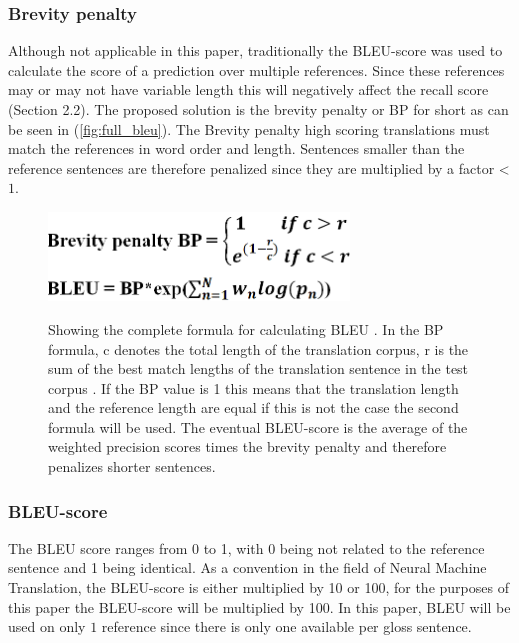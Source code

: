 \subsubsection{Brevity penalty}
Although not applicable in this paper, traditionally the BLEU-score was used to calculate the score of a prediction over multiple references. Since these references may or may not have variable length this will negatively affect the recall score \cite{papineni2002bleu} (Section 2.2). The proposed solution is the brevity penalty or BP for short as can be seen in (\autoref{fig:full_bleu}). The Brevity penalty high scoring translations must match the references in word order and length. Sentences smaller than the reference sentences are therefore penalized since they are multiplied by a factor < $1$. 


\begin{figure}[h]
 \caption{Showing the complete formula for calculating BLEU \cite{papineni2002bleu}. In the BP formula, c denotes the total length of the translation corpus, r is the sum of the best match lengths of the translation sentence in the test corpus \cite{papineni2002bleu}. If the BP value is 1 this means that the translation length and the reference length are equal if this is not the case the second formula will be used. The eventual BLEU-score is the average of the weighted precision scores times the brevity penalty and therefore penalizes shorter sentences. }
 \centering 
 \includegraphics[width=8cm]{Bachelor CSAI thesis template/images/bleu_formula.PNG}
 \label{fig:full_bleu}
\end{figure}

\subsubsection{BLEU-score}

The BLEU score ranges from 0 to 1, with 0 being not related to the reference sentence and 1 being identical. As a convention in the field of Neural Machine Translation, the BLEU-score is either multiplied by 10 or 100, for the purposes of this paper the BLEU-score will be multiplied by 100. In this paper, BLEU will be used on only $1$ reference since there is only one available per gloss sentence.

